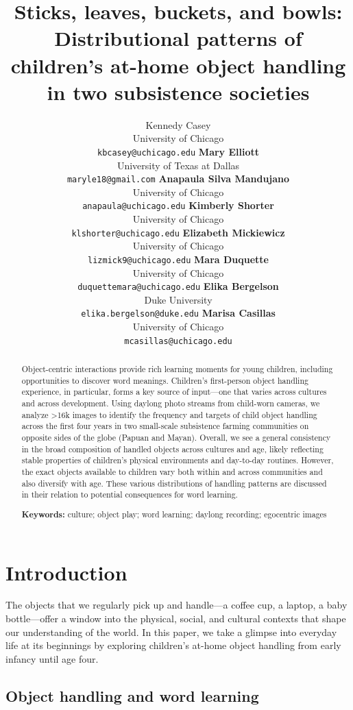 \documentclass[10pt, letterpaper]{article}
\title{Sticks, leaves, buckets, and bowls: Distributional patterns of
children's at-home object handling in two subsistence societies}
\author{Kennedy Casey \\
        University of Chicago \\
        \texttt{\small{kbcasey@uchicago.edu}}
\And \textbf{Mary Elliott} \\
             University of Texas at Dallas \\
             \texttt{\small{maryle18@gmail.com}}
\And \textbf{Anapaula Silva Mandujano} \\
             University of Chicago \\
             \texttt{\small{anapaula@uchicago.edu}}   
\And \textbf{Kimberly Shorter} \\
             University of Chicago \\
             \texttt{\small{klshorter@uchicago.edu}}
\AND \textbf{Elizabeth Mickiewicz} \\
             University of Chicago \\
             \texttt{\small{lizmick9@uchicago.edu}}         
\And \textbf{Mara Duquette} \\
             University of Chicago \\
             \texttt{\small{duquettemara@uchicago.edu}}
\And \textbf{Elika Bergelson} \\
             Duke University \\
             \texttt{\small{elika.bergelson@duke.edu}}
\And \textbf{Marisa Casillas} \\
             University of Chicago \\
             \texttt{\small{mcasillas@uchicago.edu}}}
\begin{document}
\maketitle

\begin{abstract}
Object-centric interactions provide rich learning moments for young
children, including opportunities to discover word meanings. Children's
first-person object handling experience, in particular, forms a key
source of input---one that varies across cultures and across
development. Using daylong photo streams from child-worn cameras, we
analyze \textgreater16k images to identify the frequency and targets of
child object handling across the first four years in two small-scale
subsistence farming communities on opposite sides of the globe (Papuan
and Mayan). Overall, we see a general consistency in the broad
composition of handled objects across cultures and age, likely
reflecting stable properties of children's physical environments and
day-to-day routines. However, the exact objects available to children
vary both within and across communities and also diversify with age.
These various distributions of handling patterns are discussed in their
relation to potential consequences for word learning.

\textbf{Keywords:}
culture; object play; word learning; daylong recording; egocentric
images
\end{abstract}

\hypertarget{introduction}{%
\section{Introduction}\label{introduction}}

The objects that we regularly pick up and handle---a coffee cup, a
laptop, a baby bottle---offer a window into the physical, social, and
cultural contexts that shape our understanding of the world. In this
paper, we take a glimpse into everyday life at its beginnings by
exploring children's at-home object handling from early infancy until
age four.

\hypertarget{object-handling-and-word-learning}{%
\subsection{Object handling and word
learning}\label{object-handling-and-word-learning}}
\end{document}
